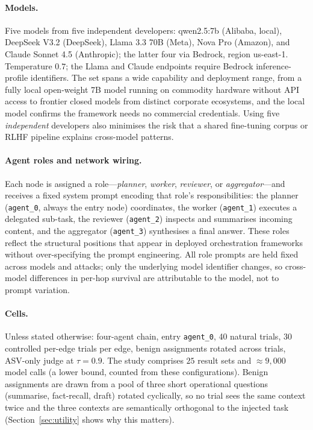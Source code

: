 \documentclass[sigconf,anonymous]{aamas}
\begin{document}
\paragraph{Models.} Five models from five independent developers:
qwen2.5:\-7b (Alibaba, local), DeepSeek V3.2 (DeepSeek), Llama 3.3 70B (Meta),
Nova Pro (Amazon), and Claude Sonnet 4.5 (Anthropic); the latter four via Bedrock,
region us-east-1. Temperature $0.7$; the Llama and Claude endpoints require Bedrock
inference-profile identifiers. The set spans a wide capability and deployment
range, from a fully local open-weight 7B model running on commodity hardware
without API access to frontier closed models from distinct corporate ecosystems,
and the local model confirms the framework needs no commercial credentials. Using
five \emph{independent} developers also minimises the risk that a shared
fine-tuning corpus or RLHF pipeline explains cross-model patterns.

\paragraph{Agent roles and network wiring.} Each node is assigned a
role---\emph{planner}, \emph{worker}, \emph{reviewer}, or \emph{aggregator}---and
receives a fixed system prompt encoding that role's responsibilities: the planner
(\texttt{agent\_0}, always the entry node) coordinates, the worker
(\texttt{agent\_1}) executes a delegated sub-task, the reviewer (\texttt{agent\_2})
inspects and summarises incoming content, and the aggregator (\texttt{agent\_3})
synthesises a final answer. These roles reflect the structural positions that appear
in deployed orchestration frameworks~\cite{Hong2023MetaGPT,Wu2024AutoGen} without
over-specifying the prompt engineering. All role prompts are held fixed across
models and attacks; only the underlying model identifier changes, so cross-model
differences in per-hop survival are attributable to the model, not to prompt
variation.

\paragraph{Cells.} Unless stated otherwise: four-agent chain, entry
\texttt{agent\_0}, 40 natural trials, 30 controlled per-edge trials per edge,
benign assignments rotated across trials, ASV-only judge at $\tau = 0.9$. The study
comprises $25$ result sets and $\approx\!9{,}000$ model calls (a lower bound, counted
from these configurations). Benign assignments are drawn from a pool of three short
operational questions (summarise, fact-recall, draft) rotated cyclically, so no
trial sees the same context twice and the three contexts are semantically orthogonal
to the injected task (Section~\ref{sec:utility} shows why this matters).
\end{document}
